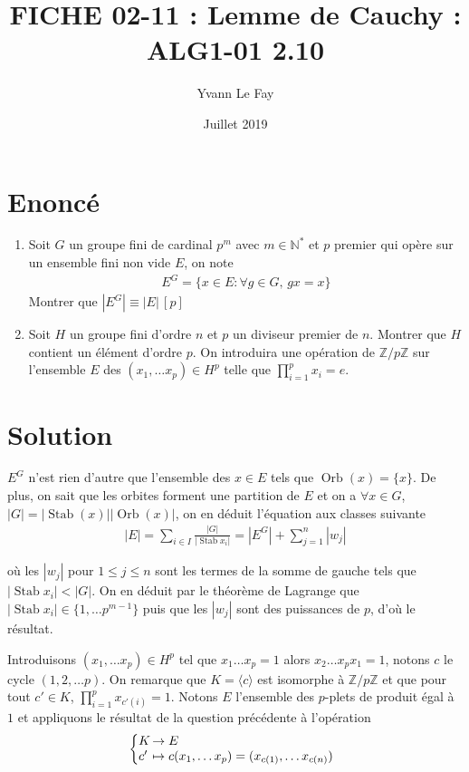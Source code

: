 \documentclass{article}
\DeclareMathOperator{\stab}{Stab}
\DeclareMathOperator{\orb}{Orb}
\begin{document}
\title{FICHE 02-11 : Lemme de Cauchy : ALG1-01 2.10}
\author{Yvann Le Fay}
\date{Juillet 2019}
\maketitle
\section*{Enoncé}
\begin{enumerate}
	\item Soit $G$ un groupe fini de cardinal $p^m$ avec $m\in\mathbb{N}^*$ et $p$ premier qui opère sur un ensemble fini non vide $E$, on note 
		\begin{align*}
			E^G = \{x\in E : \forall g \in G,\, gx = x\}
		\end{align*}
		Montrer que $|E^G| \equiv |E|\, [p]$
	\item Soit $H$ un groupe fini d'ordre $n$ et $p$ un diviseur premier de $n$. Montrer que $H$ contient un élément d'ordre $p$. On introduira une opération de $\mathbb{Z}/p\mathbb{Z}$ sur l'ensemble $E$ des $(x_1,\ldots x_p)\in H^p$ telle que $\prod_{i=1}^p x_i = e$.

\end{enumerate}
\section*{Solution}
$E^G$ n'est rien d'autre que l'ensemble des $x\in E$ tels que $\orb(x) = \{x\}$. De plus, on sait que les orbites forment une partition de $E$ et on a $\forall x \in G$, $|G|=|\stab(x)||\orb(x)|$, on en déduit l'équation aux classes suivante
\begin{align*}
	|E|=\sum_{i\in I} \frac{|G|}{|\stab{x_i}|} = |E^G|+\sum_{j=1}^n |w_j|
\end{align*}

où les $|w_j|$ pour $1\leq j \leq n$ sont les termes de la somme de gauche tels que $|\stab{x_i}|<|G|$. On en déduit par le théorème de Lagrange que $|\stab{x_i}| \in \{1,\ldots p^{m-1}\}$ puis que les $|w_j|$ sont des puissances de $p$, d'où le résultat.

Introduisons $(x_1,\ldots x_p)\in H^p$ tel que $x_1\ldots x_p = 1$ alors $x_2\ldots x_p x_1 = 1$, notons $c$ le cycle $(1, 2,\ldots p)$. On remarque que $K = \langle c\rangle$ est isomorphe à $\mathbb{Z}/p\mathbb{Z}$ et que pour tout $c'\in K$, $\prod_{i=1}^p x_{c'(i)} = 1$. Notons $E$ l'ensemble des $p$-plets de produit égal à $1$ et appliquons le résultat de la question précédente à l'opération 
\begin{align*}
 \left\{
     \begin{array}{@{}l@{\thinspace}l}
     K &\to E\\
     c'&\mapsto c(x_1,\ldots x_p) = (x_{c(1)},\ldots x_{c(n)})
     \end{array}
   \right.   
\end{align*}
\end{document}
